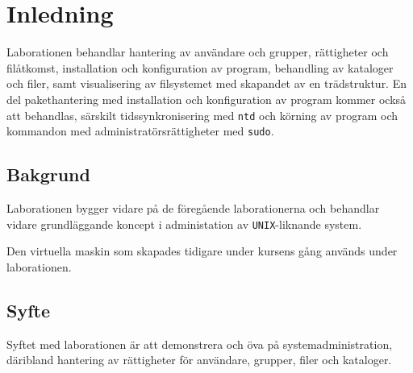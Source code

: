 %
%
%


\section{Inledning}\label{inledning}
Laborationen behandlar hantering av användare och grupper, rättigheter och
filåtkomst, installation och konfiguration av program, behandling av kataloger
och filer, samt visualisering av filsystemet med skapandet av en trädstruktur.
En del pakethantering med installation och konfiguration av program kommer
också att behandlas, särskilt tidssynkronisering med \texttt{ntd} och körning
av program och kommandon med administratörsrättigheter med \texttt{sudo}.


\subsection{Bakgrund}
Laborationen bygger vidare på de föregående laborationerna och behandlar vidare
grundläggande koncept i administation av \texttt{UNIX}-liknande system.

Den virtuella maskin som skapades tidigare under kursens gång används under
laborationen.

\subsection{Syfte}
Syftet med laborationen är att demonstrera och öva på systemadministration,
däribland hantering av rättigheter för användare, grupper, filer och kataloger.


